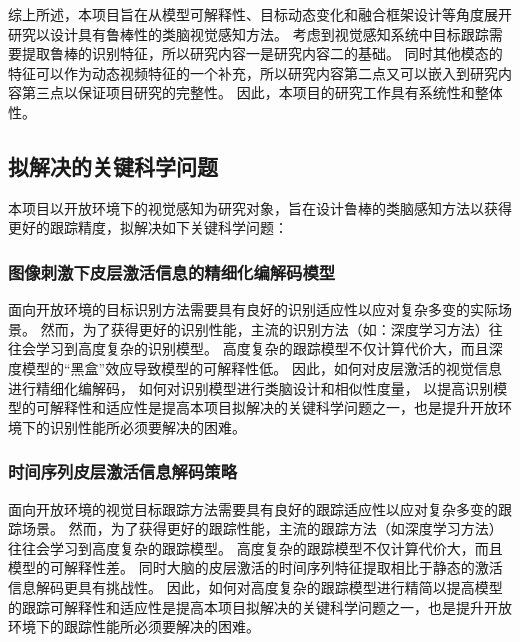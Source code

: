 \documentclass[a4paper,zihao=-4]{article}
\begin{document}
综上所述，本项目旨在从模型可解释性、目标动态变化和融合框架设计等角度展开研究以设计具有鲁棒性的类脑视觉感知方法。
考虑到视觉感知系统中目标跟踪需要提取鲁棒的识别特征，所以研究内容一是研究内容二的基础。
同时其他模态的特征可以作为动态视频特征的一个补充，所以研究内容第二点又可以嵌入到研究内容第三点以保证项目研究的完整性。
因此，本项目的研究工作具有系统性和整体性。


\textcolor{NsfcBlue}{\subsection{拟解决的关键科学问题}}

本项目以开放环境下的视觉感知为研究对象，旨在设计鲁棒的类脑感知方法以获得更好的跟踪精度，拟解决如下关键科学问题：

\subsubsection{图像刺激下皮层激活信息的精细化编解码模型}
面向开放环境的目标识别方法需要具有良好的识别适应性以应对复杂多变的实际场景。
然而，为了获得更好的识别性能，主流的识别方法（如：深度学习方法）往往会学习到高度复杂的识别模型。
高度复杂的跟踪模型不仅计算代价大，而且深度模型的“黑盒”效应导致模型的可解释性低。
因此，如何对皮层激活的视觉信息进行精细化编解码，
如何对识别模型进行类脑设计和相似性度量，
以提高识别模型的可解释性和适应性是提高本项目拟解决的关键科学问题之一，也是提升开放环境下的识别性能所必须要解决的困难。



\subsubsection{时间序列皮层激活信息解码策略}
面向开放环境的视觉目标跟踪方法需要具有良好的跟踪适应性以应对复杂多变的跟踪场景。
然而，为了获得更好的跟踪性能，主流的跟踪方法（如深度学习方法）往往会学习到高度复杂的跟踪模型。
高度复杂的跟踪模型不仅计算代价大，而且模型的可解释性差。
同时大脑的皮层激活的时间序列特征提取相比于静态的激活信息解码更具有挑战性。
因此，如何对高度复杂的跟踪模型进行精简以提高模型的跟踪可解释性和适应性是提高本项目拟解决的关键科学问题之一，也是提升开放环境下的跟踪性能所必须要解决的困难。

\end{document}
